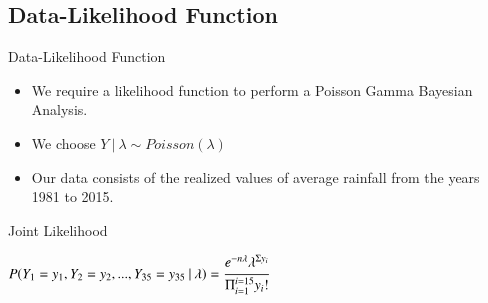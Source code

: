 \documentclass{beamer}
\begin{document}
\begin{frame}
\section{Data-Likelihood Function}
\end{frame}

\begin{frame}{Data-Likelihood Function}
    \begin{itemize}
        \item We require a likelihood function to perform a Poisson Gamma Bayesian Analysis.
        \item We choose $Y\:|\:\lambda \sim Poisson(\lambda)$
        \item Our data consists of the realized values of average rainfall from the years 1981 to 2015.
    \end{itemize}
    \begin{block}{Joint Likelihood}
        \begin{center}
            $P(Y_1=y_1, Y_2=y_2, ..., Y_{35}=y_{35}\:|\:\lambda) = \cfrac{e^{-n\lambda}\lambda^{\Sigma{y_i}}}{\Pi_{i=1}^{i=15}y_i!}$
        \end{center}
    \end{block}
\end{frame}
\end{document}
